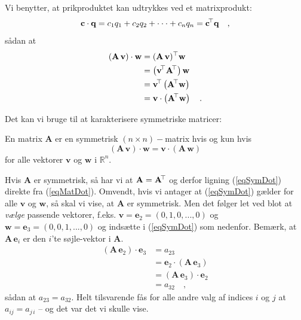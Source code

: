 \begin{bevis}
Vi benytter, at prikproduktet kan udtrykkes ved et matrixprodukt:
\begin{equation}
\mathbf{c} \cdot \mathbf{q} = c_{1}q_{1} + c_{2}q_{2} + \cdot \cdot \cdot + c_{n}q_{n} = \mathbf{c}\hspace*{-.6mm}^{\top} \mathbf{q}
\quad ,
\end{equation}
sådan at
\begin{equation}
\begin{aligned}
\left(\mathbf{A}\,\mathbf{v} \right)\cdot \mathbf{w} &= \left(\mathbf{A}\,\mathbf{v} \right)\hspace*{-.6mm}^{\top} \mathbf{w} \\
&= \left(\mathbf{v}\hspace*{-.6mm}^{\top} \mathbf{A}\hspace*{-.6mm}^{\top}  \right) \mathbf{w} \\
&= \mathbf{v}\hspace*{-.6mm}^{\top} \left(\mathbf{A}\hspace*{-.6mm}^{\top}  \mathbf{w}  \right) \\
&= \mathbf{v} \cdot \left(\mathbf{A}\hspace*{-.6mm}^{\top}  \mathbf{w}  \right) \quad .
\end{aligned}
\end{equation}
\end{bevis}

Det kan vi bruge til at karakterisere symmetriske matricer:

\begin{theorem}
En matrix $\mathbf{A}$ er en symmetrisk $(n \times n)-$matrix hvis og kun hvis
\begin{equation} \label{eqSymDot}
\left(\mathbf{A}\,\mathbf{v} \right)\cdot \mathbf{w} = \mathbf{v} \cdot \left(\mathbf{A}\,\mathbf{w}\right)
\end{equation}
for alle vektorer $\mathbf{v}$ og $\mathbf{w}$ i $\mathbb{R}^{n}$.
\end{theorem}
\begin{bevis}
Hvis $\mathbf{A}$ er symmetrisk, så har vi at $\mathbf{A} = \mathbf{A}\hspace*{-.6mm}^{\top}$ og derfor ligning (\ref{eqSymDot}) direkte fra (\ref{eqMatDot}). Omvendt, hvis vi antager at (\ref{eqSymDot}) gælder for alle $\mathbf{v}$ og $\mathbf{w}$, så skal vi vise, at $\mathbf{A}$ er symmetrisk. Men det følger let ved blot at {\em{vælge}} passende vektorer, f.eks. $\mathbf{v} = \mathbf{e}_{2} = (0, 1, 0, ..., 0)$ og $\mathbf{w} = \mathbf{e}_{3} = (0, 0, 1, ..., 0)$ og indsætte i (\ref{eqSymDot}) som nedenfor. Bemærk, at $\mathbf{A}\,\mathbf{e}_{i}$ er den $i$'te søjle-vektor i $\mathbf{A}$.
\begin{equation}
\begin{aligned}
\left(\mathbf{A}\,\mathbf{e}_{2} \right)\cdot \mathbf{e}_{3} &= a_{23} \\
&= \mathbf{e}_{2} \cdot \left(\mathbf{A}\,\mathbf{e}_{3}\right) \\
&= \left(\mathbf{A}\,\mathbf{e}_{3}\right)\cdot \mathbf{e}_{2} \\
&= a_{32} \quad,
\end{aligned}
\end{equation}
sådan at $a_{23} = a_{32}$. Helt tilsvarende fås for alle andre valg af indices $i$ og $j$ at $a_{ij}= a_{j\,i}$ -- og det var det vi skulle vise.
\end{bevis}

